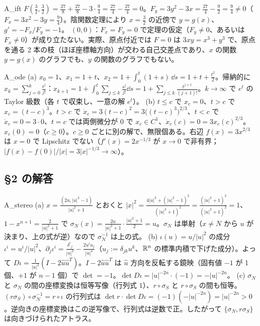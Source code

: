 \begin{soll}{A_ift}
$F(\frac32,\frac32)=\frac{27}8+\frac{27}8-3\cdot\frac94=\frac{27}4-\frac{27}4=0$。$F_y=3y^2-3x=\frac{27}4-\frac92=\frac94\ne0$（$F_x=3x^2-3y=\frac94$）。陰関数定理により $x=\frac32$ の近傍で $y=g(x)$、$g'=-F_x/F_y=-1$。
$(0,0)$：$F_x=F_y=0$ で定理の仮定（$F_y\ne0$、あるいは $F_x\ne0$）が成り立たない。実際、原点付近では $F=0$ は $3xy=x^3+y^3$ で、原点を通る 2 本の枝（ほぼ座標軸方向）が交わる自己交差点であり、$x$ の関数 $y=g(x)$ のグラフでも、$y$ の関数のグラフでもない。
\end{soll}

\begin{soll}{A_ode}
(a) $x_0=1$、$x_1=1+t$、$x_2=1+\int_0^t(1+s)\,\dd s=1+t+\frac{t^2}2$。帰納的に $x_k=\sum_{j=0}^k\frac{t^j}{j!}$：$x_{k+1}=1+\int_0^t\sum_{j\le k}\frac{s^j}{j!}\dd s=1+\sum_{j\le k}\frac{t^{j+1}}{(j+1)!}$。$k\to\infty$ で $e^t$ の Taylor 級数（各 $t$ で収束し、一意の解 $e^t$）。
(b) $t\le c$ で $x_c=0$、$t>c$ で $x_c=(t-c)^3$。$t>c$ で $\dot x_c=3(t-c)^2=3\bigl((t-c)^3\bigr)^{2/3}$、$t<c$ で $\dot x_c=0=3\cdot0$、$t=c$ では両側微分が $0$ で $x_c\in C^1$、$\dot x_c(c)=0=3x_c(c)^{2/3}$。$x_c(0)=0$（$c\ge0$）。$c\ge0$ ごとに別の解で、無限個ある。右辺 $f(x)=3x^{2/3}$ は $x=0$ で Lipschitz でない（$f'(x)=2x^{-1/3}$ が $x\to0$ で非有界；$|f(x)-f(0)|/|x|=3|x|^{-1/3}\to\infty$）。
\end{soll}


\subsection*{§2 の解答}


\begin{soll}{A_stereo}
(a) $x=\frac{(2u,|u|^2-1)}{|u|^2+1}$ とおくと $|x|^2=\frac{4|u|^2+(|u|^2-1)^2}{(|u|^2+1)^2}=\frac{(|u|^2+1)^2}{(|u|^2+1)^2}=1$、$1-x^{n+1}=\frac{2}{|u|^2+1}$ で $\sigma_N(x)=\frac{2u}{|u|^2+1}\cdot\frac{|u|^2+1}2=u$。$\sigma_N$ は単射（$x\ne N$ から $u$ が決まり、上の式が逆）なので $\sigma_N^{-1}$ は上の式。
(b) $\iota(u)=u/|u|^2$ の成分 $\iota^i=u^i/|u|^2$、$\partial_j\iota^i=\frac{\delta^i{}_j}{|u|^2}-\frac{2u^iu_j}{|u|^4}$（$u_j:=\delta_{jk}u^k$、$\mathbb R^n$ の標準内積で下げた成分）。よって $D\iota=\frac1{|u|^2}(I-2\hat u\hat u^T)$。$I-2\hat u\hat u^T$ は $\hat u$ 方向を反転する鏡映（固有値 $-1$ が 1 個、$+1$ が $n-1$ 個）で $\det=-1$。$\det D\iota=|u|^{-2n}\cdot(-1)=-|u|^{-2n}$。
(c) $\sigma_N$ と $\sigma_N$ の間の座標変換は恒等写像（行列式 $1$）、$r\circ\sigma_S$ と $r\circ\sigma_S$ の間も恒等。$(r\sigma_S)\circ\sigma_N^{-1}=r\circ\iota$ の行列式は $\det r\cdot\det D\iota=(-1)(-|u|^{-2n})=|u|^{-2n}>0$。逆向きの座標変換はこの逆写像で、行列式は逆数で正。したがって $\{\sigma_N,r\sigma_S\}$ は向きづけられたアトラス。
\end{soll}

